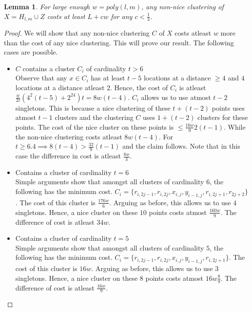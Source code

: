 \documentclass{article}
\newtheorem{lemma}[theorem]{Lemma}
\begin{document}
\begin{lemma}
For large enough $w = poly(l, m)$, any non-nice clustering of $X = H_{l, m} \cup Z$ costs at least $L + cw$ for any $c < \frac{1}{3}$.
\end{lemma}

\begin{proof}
We will show that any non-nice clustering $C$ of $X$ costs atleast $w$ more than the cost of any nice clustering. This will prove our result. The following cases are possible.

\begin{itemize}[nolistsep,leftmargin=*]
\item $C$ contains a cluster $C_i$ of cardinality $t > 6$\\
Observe that any $x \in C_i$ has at least $t-5$ locations at a distance $\ge 4$ and $4$ locations at a distance atleast $2$. Hence, the cost of $C_i$ is atleast $\frac{w}{2t}(4^2(t-5)+2^24)t = 8w(t-4)$. $C_i$ allows us to use atmost $t-2$ singletons. This is because a nice clustering of these $t+(t-2)$ points uses atmost $t-1$ clusters and the clustering $C$ uses  $1 + (t-2)$ clusters for these points. The cost of the nice cluster on these points is $\le \frac{16w}{9}2(t-1)$. While the non-nice clustering costs atleast $8w(t-4)$. For $t \ge 6.4 \implies 8(t-4) > \frac{32}{9}(t-1)$ and the claim follows. Note that in this case the difference in cost is atleast $\frac{8w}{3}$. 

\item Contains a cluster of cardinality $t = 6$\\
Simple arguments show that amongst all clusters of cardinality $6$, the following has the minimum cost. $C_i = \{r_{i, 2j-1}, r_{i, 2j}, x_{i,j}, y_{i-1, j}, r_{i, 2j+1}, r_{2j+2}\}$. The cost of this cluster is $\frac{176w}{6}$. Arguing as before, this allows us to use $4$ singletons. Hence, a nice cluster on these $10$ points costs atmost $\frac{160w}{9}$. The difference of cost is atleast $34w$.  

\item Contains a cluster of cardinality $t = 5$\\
Simple arguments show that amongst all clusters of cardinality $5$, the following has the minimum cost. $C_i = \{r_{i, 2j-1}, r_{i, 2j}, x_{i,j}, y_{i-1, j}, r_{i, 2j+1}\}$. The cost of this cluster is $16w$. Arguing as before, this allows us to use $3$ singletons. Hence, a nice cluster on these $8$ points costs atmost $16w\frac{8}{9}$. The difference of cost is atleast $\frac{16w}{9}$.  


\end{itemize}
\end{proof}
\end{document}

